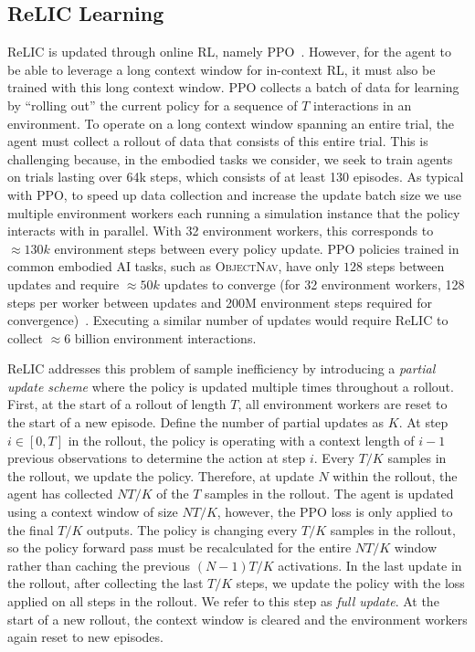 \documentclass{article}
\newcommand{\zkn}[1]{}
\newcommand{\method}{ReLIC\xspace}
\newcommand{\obnav}{\textsc{ObjectNav}\xspace}
\begin{document}
\subsection{\method Learning}
\label{sec:learning}
\method is updated through online RL, namely PPO~\citep{schulman2017proximal}.
However, for the agent to be able to leverage a long context window for in-context RL, it must also be trained with this long context window.
PPO collects a batch of data for learning by ``rolling out'' the current policy for a sequence of $ T$ interactions in an environment.
To operate on a long context window spanning an entire trial, the agent must collect a rollout of data that consists of this entire trial.
This is challenging because, in the embodied tasks we consider, we seek to train agents on trials lasting over 64k steps, which consists of at least 130 episodes.
As typical with PPO, to speed up data collection and increase the update batch size we use multiple environment workers each running a simulation instance that the policy interacts with in parallel.
With 32 environment workers, this corresponds to $ \approx 130k$ environment steps between every policy update.
PPO policies trained in common embodied AI tasks, such as \obnav, have only $128$ steps between updates and require $ \approx 50k$ updates to converge (for 32 environment workers, 128 steps per worker between updates and 200M environment steps required for convergence)~\citep{yadav2022ovrl}. Executing a similar number of updates would require \method to collect $ \approx 6 $ billion environment interactions.
\zkn{Need to explain the distinction between update intervals. Would be nice to have a diagram showing entire trial, multiple episodes within it, then which are used for updates (and then show batch axis). \\ Andrew: I think a figure will properly address this, so no need to explain it in the writing.}
\method addresses this problem of sample inefficiency by introducing a \emph{partial update scheme} where the policy is updated multiple times throughout a rollout.
First, at the start of a rollout of length $ T$, all environment workers are reset to the start of a new episode.
Define the number of partial updates as $ K$.
At step $ i \in  [0, T] $ in the rollout, the policy is operating with a context length of $ i-1$ previous observations to determine the action at step $ i$.
Every $ T/K$ samples in the rollout, we update the policy.
Therefore, at update $ N$ within the rollout, the agent has collected $ NT/K$ of the $ T$ samples in the rollout.
The agent is updated using a context window of size $ NT/K$, however, the PPO loss is only applied to the final $ T/K$ outputs.
The policy is changing every $ T/K$ samples in the rollout, so the policy forward pass must be recalculated for the entire $ NT/K$ window rather than caching the previous $ (N-1)T/K$ activations.
In the last update in the rollout, after collecting the last $T/K$ steps, we update the policy with the loss applied on all steps in the rollout. We refer to this step as \textit{full update}.
At the start of a new rollout, the context window is cleared and the environment workers again reset to new episodes.
\end{document}
